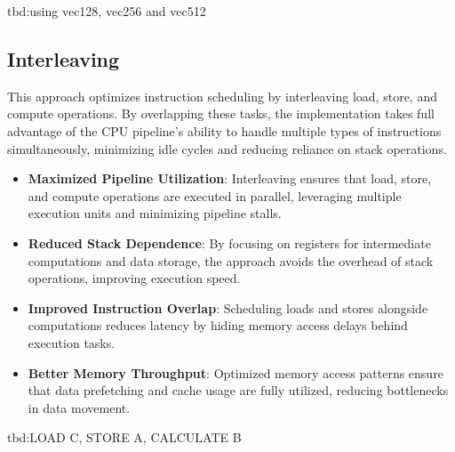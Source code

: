 \documentclass{article}
\begin{document}
tbd:using vec128, vec256 and vec512

\subsection{Interleaving}

This approach optimizes instruction scheduling by interleaving load, store, and compute operations. By overlapping these tasks, the implementation takes full advantage of the CPU pipeline’s ability to handle multiple types of instructions simultaneously, minimizing idle cycles and reducing reliance on stack operations.

\begin{itemize}
  \item \textbf{Maximized Pipeline Utilization}: Interleaving ensures that load, store, and compute operations are executed in parallel, leveraging multiple execution units and minimizing pipeline stalls.
  \item \textbf{Reduced Stack Dependence}: By focusing on registers for intermediate computations and data storage, the approach avoids the overhead of stack operations, improving execution speed.
  \item \textbf{Improved Instruction Overlap}: Scheduling loads and stores alongside computations reduces latency by hiding memory access delays behind execution tasks.
  \item \textbf{Better Memory Throughput}: Optimized memory access patterns ensure that data prefetching and cache usage are fully utilized, reducing bottlenecks in data movement.
\end{itemize}

tbd:LOAD C, STORE A, CALCULATE B

\printbibliography
\end{document}
